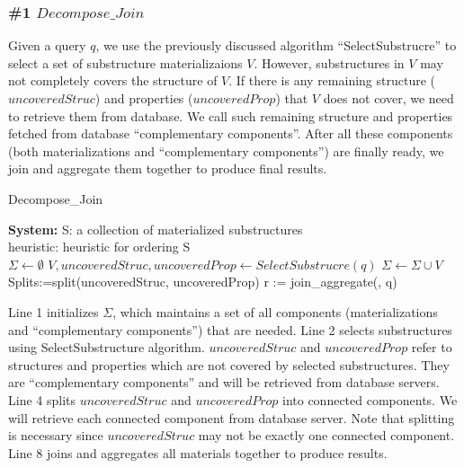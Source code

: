 \subsubsection{\#1 $Decompose\_Join$}
Given a query $q$, we use the previously discussed algorithm ``SelectSubstrucre'' to select a set of substructure materializaions $V$. However, substructures in $V$ may not completely covers the structure of $V$. If there is any remaining structure ($uncoveredStruc$) and properties ($uncoveredProp$) that $V$ does not cover, we need to retrieve them from database. We call such remaining structure and properties fetched from database ``complementary  components''. After all these components (both materializations and ``complementary  components'') are finally ready, we join and aggregate them together to produce final results.

\begin{algorithm}[H]
\caption{Decompose\_Join}
\LinesNumbered
\textbf{System:} S: a collection of materialized substructures\\ heuristic: heuristic for ordering S\\
$\Sigma \gets \emptyset $\;
$V, uncoveredStruc, uncoveredProp \gets SelectSubstrucre(q) $\;
$\Sigma \gets \Sigma \cup V $\;
Splits:=split(uncoveredStruc, uncoveredProp)\;
r := join\_aggregate(\Sigma, q)\;
\end{algorithm}

Line 1 initializes $\Sigma$, which maintains a set of all components (materializations and ``complementary  components'') that are needed. Line 2 selects substructures using SelectSubstructure algorithm. $uncoveredStruc$ and $uncoveredProp$ refer to structures and properties which are not covered by selected substructures. They are ``complementary components'' and will be retrieved from database servers. Line 4 splits $uncoveredStruc$ and $uncoveredProp$ into connected components. We will retrieve each connected component from database server. Note that splitting is necessary since $uncoveredStruc$ may not be exactly one connected component. Line 8 joins and aggregates all materials together to produce results. 

